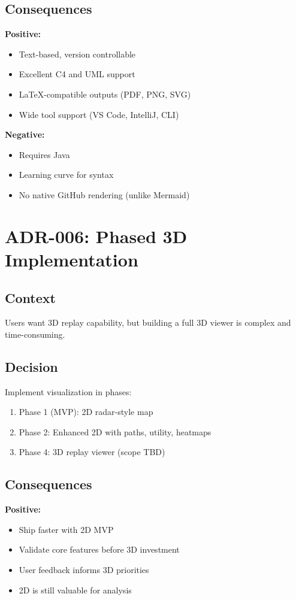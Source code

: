 \subsection{Consequences}

\textbf{Positive:}
\begin{itemize}
    \item Text-based, version controllable
    \item Excellent C4 and UML support
    \item LaTeX-compatible outputs (PDF, PNG, SVG)
    \item Wide tool support (VS Code, IntelliJ, CLI)
\end{itemize}

\textbf{Negative:}
\begin{itemize}
    \item Requires Java
    \item Learning curve for syntax
    \item No native GitHub rendering (unlike Mermaid)
\end{itemize}

\section{ADR-006: Phased 3D Implementation}

\subsection{Context}
Users want 3D replay capability, but building a full 3D viewer is complex and time-consuming.

\subsection{Decision}
Implement visualization in phases:
\begin{enumerate}
    \item Phase 1 (MVP): 2D radar-style map
    \item Phase 2: Enhanced 2D with paths, utility, heatmaps
    \item Phase 4: 3D replay viewer (scope TBD)
\end{enumerate}

\subsection{Consequences}

\textbf{Positive:}
\begin{itemize}
    \item Ship faster with 2D MVP
    \item Validate core features before 3D investment
    \item User feedback informs 3D priorities
    \item 2D is still valuable for analysis
\end{itemize}

